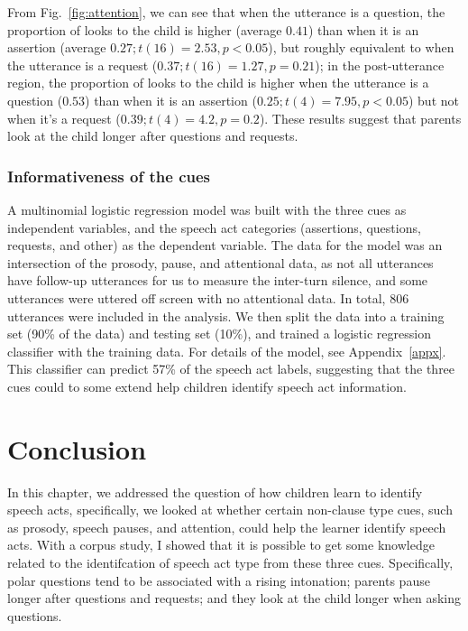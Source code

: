 From Fig.~\ref{fig:attention}, we can see that when the utterance is a question, the proportion of looks to the child is higher (average $0.41$) than when it is an assertion (average $0.27; t(16) = 2.53, p <0.05$), but roughly equivalent to when the utterance is a request ($0.37; t(16)= 1.27, p=0.21$); in the post-utterance region, the proportion of looks to the child is higher when the utterance is a question ($0.53$) than when it is an assertion ($0.25; t(4) = 7.95, p<0.05$) but not when it's a request ($0.39; t(4) = 4.2, p=0.2$). These results suggest that parents look at the child longer after questions and requests. %


\subsubsection{Informativeness of the cues}
\label{sec:engsp:results:stats}
A multinomial logistic regression model was built with the three cues as independent variables, and the speech act categories (assertions, questions, requests, and other) as the dependent variable. The data for the model was an intersection of the prosody, pause, and attentional data, as not all utterances have follow-up utterances for us to measure the inter-turn silence, and some utterances were uttered off screen with no attentional data. In total, 806 utterances were included in the analysis.  We then split the data into a training set (90\% of the data) and testing set (10\%), and trained a logistic regression classifier with the training data. For details of the model, see Appendix~\ref{appx}. This classifier can predict 57\% of the speech act labels, suggesting that the three cues could to some extend help children identify speech act information. 

\section{Conclusion}
\label{sec:engsp:discussion}
In this chapter, we addressed the question of how children learn to identify speech acts, specifically, we looked at whether certain non-clause type cues, such as prosody, speech pauses, and attention, could help the learner identify speech acts. With a corpus study, I showed that it is possible to get some knowledge related to the identifcation of speech act type from these three cues. Specifically, polar questions tend to be associated with a rising intonation; parents pause longer after questions and requests; and they look at the child longer when asking questions. 



